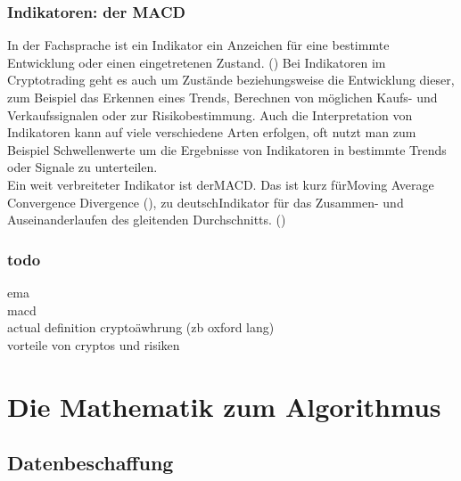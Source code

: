 \documentclass[12pt]{article}
\begin{document}
	\subsubsection{Indikatoren: der MACD}
		In der Fachsprache ist ein Indikator ein Anzeichen für eine bestimmte Entwicklung oder einen eingetretenen Zustand. (\cite{OxfordLanguageIndicator}) Bei Indikatoren im Cryptotrading geht es auch um Zustände beziehungsweise die Entwicklung dieser, zum Beispiel das Erkennen eines Trends, Berechnen von möglichen Kaufs- und Verkaufssignalen oder zur Risikobestimmung. Auch die Interpretation von Indikatoren kann auf viele verschiedene Arten erfolgen, oft nutzt man zum Beispiel Schwellenwerte um die Ergebnisse von Indikatoren in bestimmte Trends oder Signale zu unterteilen.\\
		Ein weit verbreiteter Indikator ist der\glqq MACD.\grqq{} Das ist kurz für\glqq Moving Average Convergence Divergence\grqq{} (\cite{investopediaMACD}), zu deutsch\glqq Indikator für das Zusammen- und Auseinanderlaufen des gleitenden Durchschnitts.\grqq{} (\cite{wikipediaMACDDeutsch})
	\subsubsection{todo}
		ema \\
		macd\\
		actual definition cryptoäwhrung (zb oxford lang)\\
		vorteile von cryptos und risiken

\section{Die Mathematik zum Algorithmus}
\subsection{Datenbeschaffung}
\end{document}
